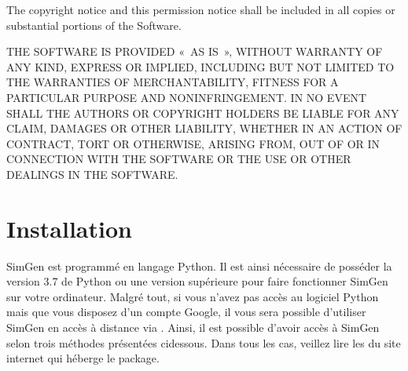 \documentclass[letterpaper,10pt,french]{sphinxmanual}
\begin{document}
The copyright notice and this permission notice shall be included in all copies or substantial portions of the Software.

THE SOFTWARE IS PROVIDED « AS IS », WITHOUT WARRANTY OF ANY KIND, EXPRESS OR
IMPLIED, INCLUDING BUT NOT LIMITED TO THE WARRANTIES OF MERCHANTABILITY,
FITNESS FOR A PARTICULAR PURPOSE AND NONINFRINGEMENT. IN NO EVENT SHALL THE
AUTHORS OR COPYRIGHT HOLDERS BE LIABLE FOR ANY CLAIM, DAMAGES OR OTHER
LIABILITY, WHETHER IN AN ACTION OF CONTRACT, TORT OR OTHERWISE, ARISING FROM,
OUT OF OR IN CONNECTION WITH THE SOFTWARE OR THE USE OR OTHER DEALINGS IN THE
SOFTWARE.


\section{Installation}
\label{\detokenize{installation:installation}}\label{\detokenize{installation:id1}}\label{\detokenize{installation::doc}}\label{\detokenize{installation:installing-docdir}}
SimGen est programmé en langage Python. Il est ainsi nécessaire de posséder la version 3.7 de Python ou une version supérieure pour faire fonctionner SimGen sur votre ordinateur.
Malgré tout, si vous n’avez pas accès au logiciel Python mais que vous disposez d’un compte Google, il vous sera possible d’utiliser SimGen en accès à distance via .
Ainsi, il est possible d’avoir accès à SimGen selon trois méthodes présentées ci\sphinxhyphen{}dessous.
Dans tous les cas, veillez lire les  du site internet  qui héberge le package.
\end{document}
